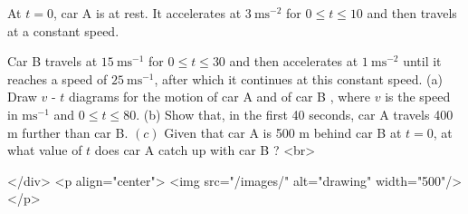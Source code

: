 At $t=0$, car A is at rest. It accelerates at $3 \mathrm{~ms}^{-2}$ for $0 \leq t \leq 10$ and then travels at a constant speed.

Car B travels at $15 \mathrm{~ms}^{-1}$ for $0 \leq t \leq 30$ and then accelerates at $1 \mathrm{~ms}^{-2}$ until it reaches a speed of $25 \mathrm{~ms}^{-1}$, after which it continues at this constant speed.
(a) Draw $v$ - $t$ diagrams for the motion of car A and of car B , where $v$ is the speed in $\mathrm{ms}^{-1}$ and $0 \leq t \leq 80$.
(b) Show that, in the first 40 seconds, car A travels 400 m further than car B.
\((c)\) Given that car A is 500 m behind car B at $t=0$, at what value of $t$ does car A catch up with car B ?
<br>

</div>
<p align="center">
<img src="/images/" alt="drawing" width="500"/>
</p>
